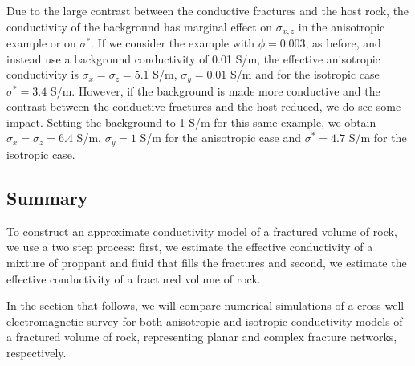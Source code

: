 Due to the large contrast between the conductive fractures and the host rock, the conductivity of the background has marginal effect on $\sigma_{x, z}$ in the anisotropic example or on $\sigma^*$. If we consider the example with $\phi = 0.003$, as before, and instead use a background conductivity of 0.01 S/m, the effective anisotropic conductivity is $\sigma_x = \sigma_z = 5.1$ S/m, $\sigma_y = 0.01$ S/m and for the isotropic case $\sigma^* = 3.4$ S/m. However, if the background is made more conductive and the contrast between the conductive fractures and the host reduced, we do see some impact. Setting the background to 1 S/m for this same example, we obtain $\sigma_x = \sigma_z = 6.4$ S/m, $\sigma_y = 1$ S/m for the anisotropic case and $\sigma^* = 4.7$ S/m for the isotropic case.


\subsection{Summary}
To construct an approximate conductivity model of a fractured volume of rock, we use a two step process: first, we estimate the effective conductivity of a mixture of proppant and fluid that fills the fractures and second, we estimate the effective conductivity of a fractured volume of rock.

In the section that follows, we will compare numerical simulations of a cross-well electromagnetic survey for both anisotropic and isotropic conductivity models of a fractured volume of rock, representing planar and complex fracture networks, respectively.


